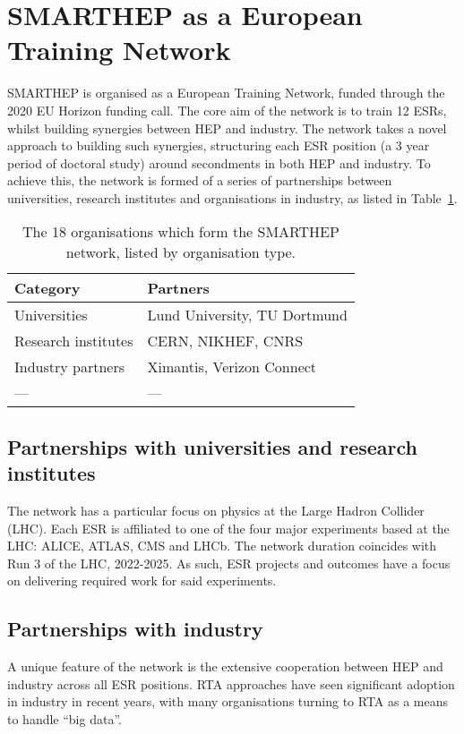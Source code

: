 \section{SMARTHEP as a European Training Network}
\label{network}
SMARTHEP is organised as a European Training Network, funded through the 2020 EU Horizon funding call. The core aim of the network is to train 12 ESRs, whilst building synergies between HEP and industry. The network takes a novel approach to building such synergies, structuring each ESR position (a 3 year period of doctoral study) around secondments in both HEP and industry. To achieve this, the network is formed of a series of partnerships between universities, research institutes and organisations in industry, as listed in Table~\ref{partners}.

\begin{table}[h!]
    \centering
    \caption{The 18 organisations which form the SMARTHEP network, listed by organisation type.}
    \label{partners}       
    \begin{tabular}{ll}
    \hline
    Category & Partners \\\hline
    Universities        & Lund University, TU Dortmund \\
    Research institutes & CERN, NIKHEF, CNRS \\
    Industry partners   & Ximantis, Verizon Connect \\
    --- & --- \\\hline
    \end{tabular}
\end{table}


\subsection{Partnerships with universities and research institutes}
\label{sec-2}
The network has a particular focus on physics at the Large Hadron Collider (LHC). Each ESR is affiliated to one of the four major experiments based at the LHC: ALICE, ATLAS, CMS and LHCb. The network duration coincides with Run 3 of the LHC, 2022-2025. As such, ESR projects and outcomes have a focus on delivering required work for said experiments.

\subsection{Partnerships with industry}
\label{sec-2}
A unique feature of the network is the extensive cooperation between HEP and industry across all ESR positions. RTA approaches have seen significant adoption in industry in recent years, with many organisations turning to RTA as a means to handle ``big data''.